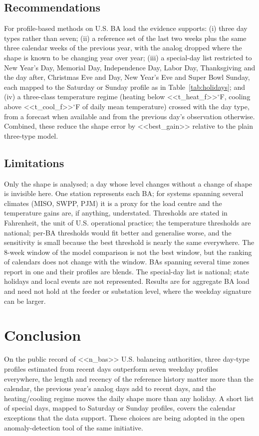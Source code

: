 \documentclass[conference]{IEEEtran}
\begin{document}
\subsection{Recommendations}
For profile-based methods on U.S. BA load the evidence supports: (i) three day types rather than seven; (ii) a reference set of the last two weeks plus the same three calendar weeks of the previous year, with the analog dropped where the shape is known to be changing year over year; (iii) a special-day list restricted to New Year's Day, Memorial Day, Independence Day, Labor Day, Thanksgiving and the day after, Christmas Eve and Day, New Year's Eve and Super Bowl Sunday, each mapped to the Saturday or Sunday profile as in Table~\ref{tab:holidays}; and (iv) a three-class temperature regime (heating below <<t_heat_f>>$^\circ$F, cooling above <<t_cool_f>>$^\circ$F of daily mean temperature) crossed with the day type, from a forecast when available and from the previous day's observation otherwise. Combined, these reduce the shape error by <<best_gain>> relative to the plain three-type model.

\subsection{Limitations}
Only the shape is analysed; a day whose level changes without a change of shape is invisible here. One station represents each BA; for systems spanning several climates (MISO, SWPP, PJM) it is a proxy for the load centre and the temperature gains are, if anything, understated. Thresholds are stated in Fahrenheit, the unit of U.S. operational practice; the temperature thresholds are national; per-BA thresholds would fit better and generalise worse, and the sensitivity is small because the best threshold is nearly the same everywhere. The 8-week window of the model comparison is not the best window, but the ranking of calendars does not change with the window. BAs spanning several time zones report in one and their profiles are blends. The special-day list is national; state holidays and local events are not represented. Results are for aggregate BA load and need not hold at the feeder or substation level, where the weekday signature can be larger.

\section{Conclusion}
On the public record of <<n_bas>> U.S. balancing authorities, three day-type profiles estimated from recent days outperform seven weekday profiles everywhere, the length and recency of the reference history matter more than the calendar, the previous year's analog days add to recent days, and the heating/cooling regime moves the daily shape more than any holiday. A short list of special days, mapped to Saturday or Sunday profiles, covers the calendar exceptions that the data support. These choices are being adopted in the open anomaly-detection tool of the same initiative.
\end{document}
